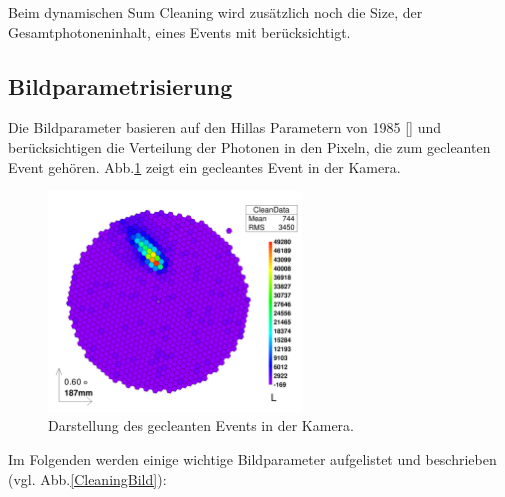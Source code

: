 Beim dynamischen Sum Cleaning wird zusätzlich noch die Size, der Gesamtphotoneninhalt, eines Events mit berücksichtigt.

\subsection{Bildparametrisierung}
Die Bildparameter basieren auf den Hillas Parametern von 1985 [] und berücksichtigen die Verteilung der Photonen in den Pixeln, die zum gecleanten Event gehören.
Abb.\ref{Kamera-Bild-gecleant} zeigt ein gecleantes Event in der Kamera.

\begin{figure}
    \centering
    \includegraphics[width=0.6\textwidth]{./Plots/Signal_gecleant_fertig.png}
    \caption{Darstellung des gecleanten Events in der Kamera.}
    \label{Kamera-Bild-gecleant}
\end{figure}


Im Folgenden werden einige wichtige Bildparameter aufgelistet und beschrieben (vgl. Abb.\ref{CleaningBild}):

